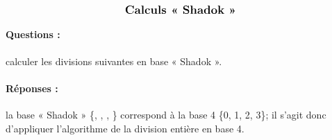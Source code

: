 \documentclass[11pt,a4paper]{article}
\begin{document}

$$\mbox{\textbf{\large Calculs « Shadok »}}$$

\paragraph{Questions :} calculer les divisions suivantes en base « Shadok ».

\paragraph{Réponses :} la base « Shadok » \{\ga{}, \bu{}, \zo{}, \meu{}\}
correspond à la base 4 \{0, 1, 2, 3\}; il s'agit donc d'appliquer l'algorithme de la division entière en base 4.
\vspace*{3mm}
\end{document}
